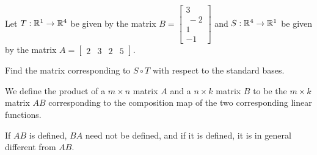 \begin{applicationActivities}{1}{21}
%

\begin{activity}{5}
Let $T: \mathbb{R}^1 \rightarrow \mathbb{R}^4$ be given by the matrix $B=\begin{bmatrix} 3 \\\ -2 \\ 1 \\ -1\end{bmatrix}$ and $S: \mathbb{R}^4 \rightarrow \mathbb{R}^1$ be given by the matrix $A=\begin{bmatrix}2 & 3 & 2 & 5 \end{bmatrix}$.

  Find the matrix corresponding to $S \circ T$ with respect to the standard bases.
\end{activity}

\begin{definition}
We define the product of a $m \times n$ matrix $A$ and a $n \times k$ matrix $B$ to be the $m \times k$ matrix $AB$ corresponding to the composition map of the two corresponding linear functions.
\end{definition}

\begin{fact}
If $AB$ is defined, $BA$ need not be defined, and if it is defined, it is in general different from $AB$.
\end{fact}


\end{applicationActivities}
